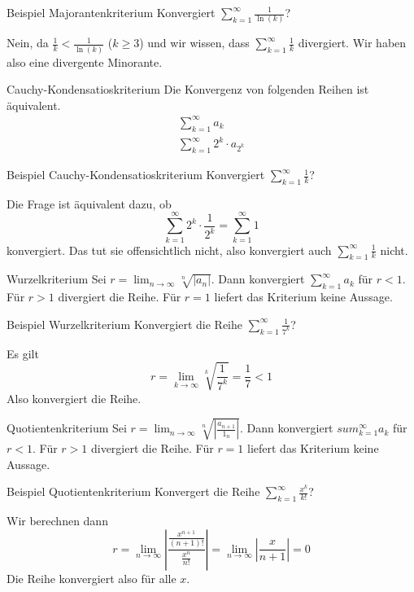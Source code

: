 \documentclass[german]{spicker}
\begin{document}
\begin{bonus}{Beispiel Majorantenkriterium}
    Konvergiert $\sum_{k=1}^{\infty} \frac{1}{\ln(k)}$?

    Nein, da $\frac{1}{k} < \frac{1}{\ln(k)}$ ($k\geq3$) und wir wissen, dass $\sum_{k=1}^{\infty} \frac{1}{k}$ divergiert.
    Wir haben also eine divergente Minorante.
\end{bonus}

\begin{algo}{Cauchy-Kondensatioskriterium}
    Die Konvergenz von folgenden Reihen ist äquivalent.
    \begin{align}
        \sum_{k=1}^{\infty} a_k \\
        \sum_{k=1}^{\infty} 2^k \cdot a_{2^k}
    \end{align}
\end{algo}

\begin{bonus}{Beispiel Cauchy-Kondensatioskriterium}
    Konvergiert $\sum_{k=1}^{\infty} \frac{1}{k}$?

    Die Frage ist äquivalent dazu, ob
    \[
        \sum_{k=1}^{\infty} 2^k \cdot \frac{1}{2^k} = \sum_{k=1}^{\infty} 1
    \]
    konvergiert. Das tut sie offensichtlich nicht, also konvergiert auch $\sum_{k=1}^{\infty} \frac{1}{k}$ nicht.
\end{bonus}

\begin{algo}{Wurzelkriterium}
    Sei $r = \lim_{n\to\infty} \sqrt[n]{|a_n|}$.
    Dann konvergiert $\sum_{k=1}^{\infty} a_k$ für $r<1$.
    Für $r>1$ divergiert die Reihe.
    Für $r=1$ liefert das Kriterium keine Aussage.
\end{algo}

\begin{bonus}{Beispiel Wurzelkriterium}
    Konvergiert die Reihe $\sum_{k=1}^{\infty} \frac{1}{7^k}$?

    Es gilt
    \[
        r = \lim_{k\to\infty} \sqrt[k]{\frac{1}{7^k}} = \frac{1}{7} < 1
    \]
    Also konvergiert die Reihe.
\end{bonus}

\begin{algo}{Quotientenkriterium}
    Sei $r = \lim_{n\to\infty} \sqrt[n]{\left| \frac{a_{n+1}}{1_n} \right|}$.
    Dann konvergiert $sum_{k=1}^{\infty} a_k$ für $r<1$.
    Für $r>1$ divergiert die Reihe.
    Für $r=1$ liefert das Kriterium keine Aussage.
\end{algo}

\begin{bonus}{Beispiel Quotientenkriterium}
    Konvergert die Reihe $\sum_{k=1}^{\infty} \frac{x^k}{k!}$?

    Wir berechnen dann
    \[
        r = \lim_{n\to\infty} \left| \frac{\frac{x^{n+1}}{(n+1)!}}{\frac{x^n}{n!}} \right|
        = \lim_{n\to\infty} \left| \frac{x}{n+1} \right| = 0
    \]
    Die Reihe konvergiert also für alle $x$.
\end{bonus}
\end{document}
